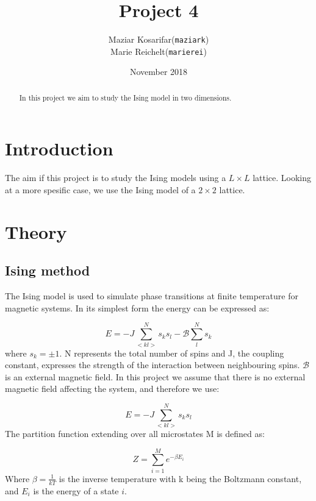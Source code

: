 \documentclass{article}
\title{Project 4}
\author{
    \begin{tabular}{r l}
        Maziar Kosarifar & (\texttt{maziark})\\
        Marie Reichelt & (\texttt{marierei})
\end{tabular}}
\date{November 2018}
\begin{document}
\maketitle

\begin{abstract}
\noindent
In this project we aim to study the Ising model in two dimensions.
\end{abstract}

\vfill

\section{Introduction}

The aim if this project is to study the Ising models using a $L \times L$ lattice. Looking at a more spesific case, we use the Ising model of a $2 \times 2$ lattice.



\section{Theory}

\subsection{Ising method}

The Ising model is used to simulate phase transitions at finite temperature for magnetic systems\cite{mhj}. In its simplest form the energy can be expressed as:

    $$E = -J \sum_{<kl>}^N s_k s_l - \mathscr{B} \sum_l^N s_k$$
where $s_k = \pm 1$. N represents the total number of spins and J, the coupling constant, expresses the strength of the interaction between neighbouring spins. $\mathscr{B}$ is an external magnetic field. In this project we assume that there is no external magnetic field affecting the system, and therefore we use:

\begin{equation}
    E = -J \sum_{<kl>}^N s_k s_l
\end{equation}
The partition function extending over all microstates M is defined as:

\begin{equation}
    Z = \sum_{i=1}^M e^{-\beta E_i}
\end{equation}
Where $\beta = \frac{1}{kT}$ is the inverse temperature with k being the Boltzmann constant, and $E_i$ is the energy of a state $i$.
\end{document}

